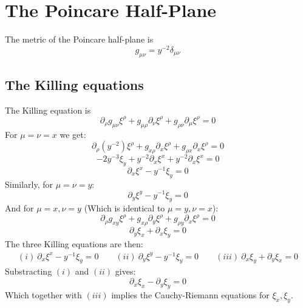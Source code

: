 \documentclass{article}
\begin{document}
\section{The Poincare Half-Plane}
The metric of the Poincare half-plane is
\begin{equation}
\label{eq:poincare-metric}
    g_{\mu\nu} = y^{-2}\delta_{\mu\nu}
\end{equation}
\subsection{The Killing equations}
The Killing equation is
\begin{equation}
    \partial_\rho g_{\mu\nu}\xi^\rho + g_{\mu\rho}\partial_\nu \xi^\rho + g_{\rho\nu}\partial_\mu \xi^\rho = 0
\end{equation}
For $\mu = \nu = x$ we get:
\begin{equation}
    \partial_\rho \left(y^{-2}\right)\xi^\rho + g_{x\rho}\partial_x \xi^\rho + g_{\rho x}\partial_x \xi^\rho = 0
\end{equation}
\begin{equation}
    -2y^{-3}\xi_y + y^{-2}\partial_x \xi^x  + y^{-2}\partial_x \xi^x = 0
\end{equation}
\begin{equation}
    \partial_x \xi^x - y^{-1}\xi_y = 0
\end{equation}
Similarly, for $\mu = \nu = y$:
\begin{equation}
    \partial_y \xi^y - y^{-1}\xi_y = 0
\end{equation}
And for $\mu = x, \nu = y$ (Which is identical to $\mu = y, \nu = x$):
\begin{equation}
    \partial_\rho g_{xy}\xi^\rho + g_{x\rho}\partial_y \xi^\rho + g_{\rho y}\partial_x \xi^\rho = 0
\end{equation}
\begin{equation}
    \partial_y \xi_x + \partial_x \xi_y = 0
\end{equation}
The three Killing equations are then:
\begin{equation}
\begin{gathered}
    (i) \ \partial_x \xi^x - y^{-1}\xi_y = 0 \qquad
    (ii) \ \partial_y \xi^y - y^{-1}\xi_y = 0 \qquad
    (iii) \ \partial_x \xi_y + \partial_y \xi_x = 0
\end{gathered}
\end{equation}
Substracting $(i)$ and $(ii)$ gives:
\begin{equation}
    \partial_x \xi_x - \partial_y \xi_y = 0
\end{equation}
Which together with $(iii)$ implies the Cauchy-Riemann equations for $\xi_x, \xi_y$.
\end{document}

